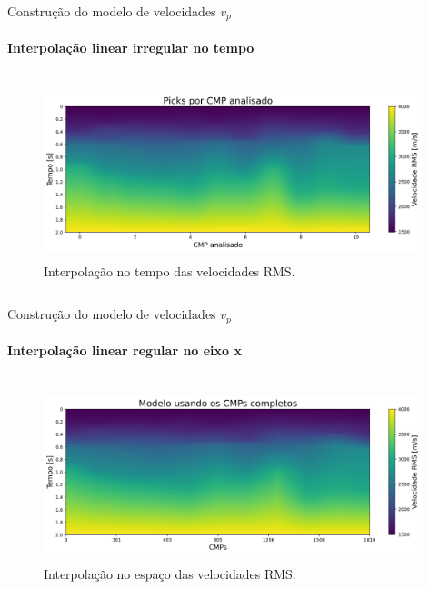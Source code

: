 \documentclass[xcolor=dvipsnames,t]{beamer}
\begin{document}
\begin{frame}{Construção do modelo de velocidades $v_p$}
	\framesubtitle{Interpolação linear irregular no tempo}	
		
	\begin{columns}[onlytextwidth, T]
		\begin{column}{.9\textwidth}
			\begin{figure}[h]
				\includegraphics[width=11cm,height=5cm]{../imagens/picksInterpVertical.png}	
				\tiny{\caption{Interpolação no tempo das velocidades RMS.}} 	
			\end{figure}			
		\end{column}
	\end{columns}	
	
\end{frame}
\begin{frame}{Construção do modelo de velocidades $v_p$}
	\framesubtitle{Interpolação linear regular no eixo x}	
	
	\begin{columns}[onlytextwidth, T]
		\begin{column}{.9\textwidth}
			\begin{figure}[h]
				\includegraphics[width=11cm,height=5cm]{../imagens/modeloCompleto.png}	
				\tiny{\caption{Interpolação no espaço das velocidades RMS.}} 	
			\end{figure}			
		\end{column}
	\end{columns}	
	
\end{frame}
\end{document}

